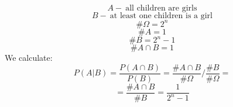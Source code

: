 \documentclass{article}
\begin{document}
\begin{equation*}
    A - \ \mbox{all children are girls}
\end{equation*}
\begin{equation*}
    B - \ \mbox{at least one children is a girl}
\end{equation*}
\begin{equation*}
    \# \Omega = 2^{n}    
\end{equation*}
\begin{equation*}
    \#A = 1
\end{equation*}
\begin{equation*}
    \#B = 2^{n} - 1
\end{equation*}
\begin{equation*}
    \#A \cap B = 1
\end{equation*}
We calculate:
\begin{equation*}
    P(A|B) = \frac{P(A \cap B)}{P(B)} = \frac{\# A \cap B}{\# \Omega} \Big/ \frac{\# B}{\# \Omega} = 
\end{equation*}
\begin{equation*}
    = \frac{\# A \cap B}{\# B} = \frac{1}{2^{n} - 1}
\end{equation*}
\end{document}

